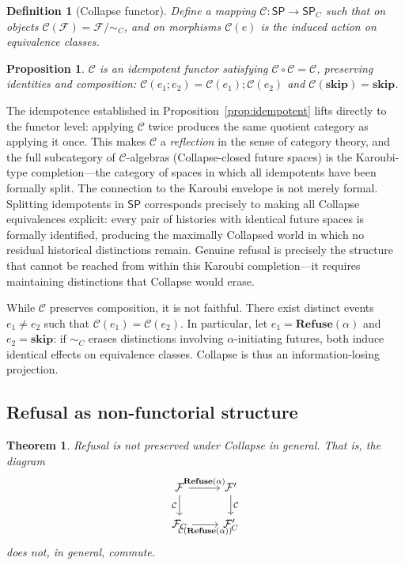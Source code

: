 \documentclass[11pt]{article}
\newtheorem{definition}{Definition}
\newtheorem{proposition}{Proposition}
\newtheorem{theorem}{Theorem}
\newcommand{\Future}{\mathcal{F}}
\begin{document}
\begin{definition}[Collapse functor]
Define a mapping $\mathcal{C} : \mathsf{SP} \to \mathsf{SP}_C$ such that on
objects $\mathcal{C}(\Future) = \Future / \sim_C$, and on morphisms
$\mathcal{C}(e)$ is the induced action on equivalence classes.
\end{definition}

\begin{proposition}
$\mathcal{C}$ is an idempotent functor satisfying
$\mathcal{C} \circ \mathcal{C} = \mathcal{C}$, preserving identities and
composition: $\mathcal{C}(e_1 ; e_2) = \mathcal{C}(e_1) ; \mathcal{C}(e_2)$
and $\mathcal{C}(\mathbf{skip}) = \mathbf{skip}$.
\end{proposition}

The idempotence established in Proposition~\ref{prop:idempotent} lifts directly
to the functor level: applying $\mathcal{C}$ twice produces the same quotient
category as applying it once. This makes $\mathcal{C}$ a \emph{reflection} in
the sense of category theory, and the full subcategory of $\mathcal{C}$-algebras
(Collapse-closed future spaces) is the Karoubi-type completion---the category of
spaces in which all idempotents have been formally split. The connection to the
Karoubi envelope is not merely formal. Splitting idempotents in $\mathsf{SP}$
corresponds precisely to making all Collapse equivalences explicit: every pair
of histories with identical future spaces is formally identified, producing the
maximally Collapsed world in which no residual historical distinctions remain.
Genuine refusal is precisely the structure that cannot be reached from within
this Karoubi completion---it requires maintaining distinctions that Collapse
would erase.

While $\mathcal{C}$ preserves composition, it is not faithful. There exist
distinct events $e_1 \neq e_2$ such that $\mathcal{C}(e_1) = \mathcal{C}(e_2)$.
In particular, let $e_1 = \mathbf{Refuse}(\alpha)$ and $e_2 = \mathbf{skip}$:
if $\sim_C$ erases distinctions involving $\alpha$-initiating futures, both
induce identical effects on equivalence classes. Collapse is thus an
information-losing projection.

\subsection{Refusal as non-functorial structure}

\begin{theorem}
Refusal is not preserved under Collapse in general. That is, the diagram
\[
\begin{tikzcd}
\Future \arrow[r, "\mathbf{Refuse}(\alpha)"] \arrow[d, "\mathcal{C}"'] &
\Future' \arrow[d, "\mathcal{C}"] \\
\Future_C \arrow[r, "\mathcal{C}(\mathbf{Refuse}(\alpha))"'] & \Future'_C
\end{tikzcd}
\]
does not, in general, commute.
\end{theorem}
\end{document}
